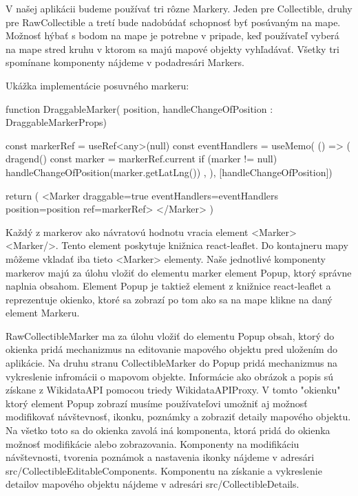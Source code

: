 V našej aplikácii budeme používať tri rôzne Markery. Jeden pre Collectible, druhy pre RawCollectible a tretí bude nadobúdať schopnosť byť posúvaným na mape. Možnosť hýbať s bodom na mape je potrebne  
v pripade, keď používateľ vyberá na mape stred kruhu v ktorom sa majú mapové objekty vyhľadávať. Všetky tri spomínane komponenty nájdeme v podadresári Markers. 

Ukážka implementácie posuvného markeru: 
\begin{code}
function DraggableMarker({ position, handleChangeOfPosition }: DraggableMarkerProps) {
const markerRef = useRef<any>(null)
const eventHandlers = useMemo(
      () => ({ dragend() 
            {
                const marker = markerRef.current
                if (marker != null) {
                    handleChangeOfPosition(marker.getLatLng())
                }
            },
        }), [handleChangeOfPosition])

return (
      <Marker
            draggable={true}
            eventHandlers={eventHandlers}
            position={position}
            ref={markerRef}>
      </Marker>
)
}
\end{code}

Každý z markerov ako návratovú hodnotu vracia element <Marker> <Marker/>. Tento element poskytuje knižnica react-leaflet. 
Do kontajneru mapy môžeme vkladať iba tieto  <Marker> elementy. Naše jednotlivé komponenty markerov majú za úlohu vložiť do elementu marker element Popup, ktorý správne naplnia obsahom. 
Element Popup je taktiež element z knižnice react-leaflet a reprezentuje okienko, ktoré sa zobrazí po tom ako sa na mape klikne na daný element Markeru. 

RawCollectibleMarker ma za úlohu vložiť do elementu Popup obsah, ktorý do okienka pridá mechanizmus na editovanie mapového objektu pred uložením do aplikácie. Na druhu stranu CollectibleMarker  
do Popup pridá mechanizmus na vykreslenie infromácii o mapovom objekte. Informácie ako obrázok a popis sú získane z WikidataAPI pomocou triedy WikidataAPIProxy. 
V tomto "okienku" ktorý element Popup zobrazí musíme používateľovi umožniť aj možnosť modifikovať návštevnosť, ikonku, poznámky a zobraziť detaily mapového objektu. Na všetko toto sa do okienka zavolá 
iná komponenta, ktorá pridá do okienka možnosť modifikácie alebo zobrazovania.  
Komponenty na modifikáciu návštevnosti, tvorenia poznámok a nastavenia ikonky nájdeme v adresári src/CollectibleEditableComponents. 
Komponentu na získanie a vykreslenie detailov mapového objektu nájdeme v adresári src/CollectibleDetails. 

